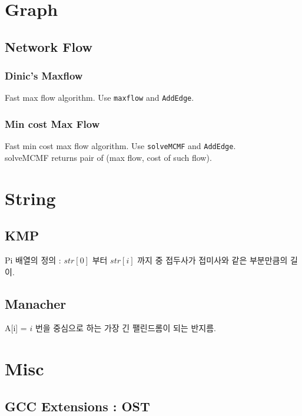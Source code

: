 \documentclass[landscape]{article}
\begin{document}
\begin{multicols}{3 }
\section{Graph}
    \subsection{Network Flow}
        \subsubsection{Dinic's Maxflow}
            Fast max flow algorithm. Use \texttt{maxflow} and \texttt{AddEdge}.
            
        \subsubsection{Min cost Max Flow}
            Fast min cost max flow algorithm. Use \texttt{solveMCMF} and \texttt{AddEdge}.\\
            solveMCMF returns pair of (max flow, cost of such flow).
            

\section{String}
    \subsection{KMP}
        Pi 배열의 정의 : $str[0]$ 부터 $str[i]$ 까지 중 접두사가 접미사와 같은 부분만큼의 길이.
        
    \subsection{Manacher}
        A[i] = $i$ 번을 중심으로 하는 가장 긴 팰린드롬이 되는 반지름.
        


\section{Misc}
    \subsection{GCC Extensions : OST}
        
\eject{}
\end{multicols}
\end{document}
